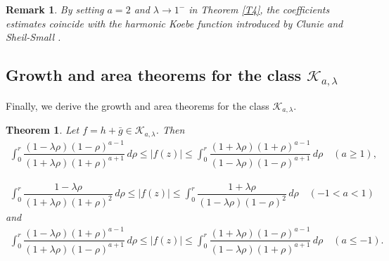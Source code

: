 \documentclass[11pt, reqno]{amsart}
\newtheorem{theorem}{Theorem}
\newtheorem{rem}{Remark}
\numberwithin{equation}{section}
\begin{document}
\begin{rem}
{\rm By setting $a=2$ and $\lambda\rightarrow 1^-$ in Theorem \ref{T4}, the coefficients estimates coincide with the harmonic Koebe function introduced by Clunie and Sheil-Small
 \cite{cs}.}
\end{rem}

\subsection{Growth and area theorems for the class $\mathcal{K}_{a,\lambda}$}
Finally, we derive the growth and area theorems for the class $\mathcal{K}_{a,\lambda}$.
\begin{theorem}\label{T5}
	Let $f=h+\bar{g}\in\mathcal{K}_{a,\lambda}$. Then
    \begin{equation}\label{T5-1}
    \begin{split}
     \displaystyle\int_{0}^{r}\dfrac{(1-\lambda \rho)(1-\rho)^{a-1}}{(1+\lambda \rho)(1+\rho)^{a+1}}\,d\rho\leq|f(z)|\leq \displaystyle\int_{0}^{r}\dfrac{(1+\lambda \rho)(1+\rho)^{a-1}}{(1-\lambda \rho)(1-\rho)^{a+1}}\,d\rho\quad(a\geq 1),
    \end{split}
    \end{equation}


 \begin{equation}\label{T5-7}
    \begin{aligned}
     \displaystyle\int_{0}^{r}\dfrac{1-\lambda \rho}{(1+\lambda \rho)(1+\rho)^{2}}\,d\rho \leq|f(z)|\leq   
     \displaystyle\int_{0}^{r}\dfrac{1+\lambda \rho}{(1-\lambda \rho)(1-\rho)^{2}}\,d\rho\quad(-1<a<1)
    \end{aligned}
    \end{equation}
and
     \begin{equation}\label{T5-2}
    \begin{aligned}
     \displaystyle\int_{0}^{r}\dfrac{(1-\lambda \rho)(1+\rho)^{a-1}}{(1+\lambda \rho)(1-\rho)^{a+1}}\,d\rho \leq|f(z)|\leq   
     \displaystyle\int_{0}^{r}\dfrac{(1+\lambda \rho)(1-\rho)^{a-1}}{(1-\lambda \rho)(1+\rho)^{a+1}}\,d\rho
     \quad(a\leq -1).
    \end{aligned}
    \end{equation}
\end{theorem}
\end{document}
